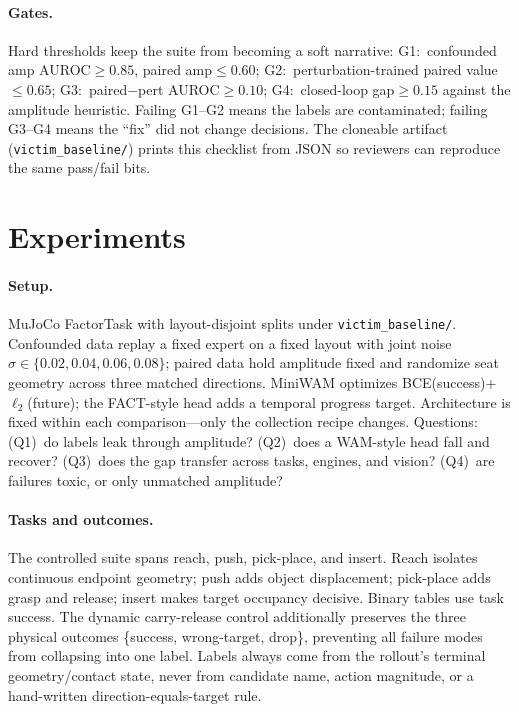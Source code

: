 \documentclass[conference]{IEEEtran}
\begin{document}
\paragraph{Gates.}
Hard thresholds keep the suite from becoming a soft narrative:
G1:~confounded amp AUROC$\ge 0.85$, paired amp$\le 0.60$;
G2:~perturbation-trained paired value$\le 0.65$;
G3:~paired$-$pert AUROC$\ge 0.10$;
G4:~closed-loop gap$\ge 0.15$ against the amplitude heuristic.
Failing G1--G2 means the labels are contaminated; failing G3--G4 means the
``fix'' did not change decisions. The cloneable artifact
(\texttt{victim\_baseline/}) prints this checklist from JSON so reviewers can
reproduce the same pass/fail bits.

\section{Experiments}
\label{sec:exp}

\paragraph{Setup.}
MuJoCo FactorTask with layout-disjoint splits under
\texttt{victim\_baseline/}. Confounded data replay a fixed expert on a fixed
layout with joint noise $\sigma\in\{0.02,0.04,0.06,0.08\}$; paired data hold
amplitude fixed and randomize seat geometry across three matched directions.
MiniWAM optimizes BCE(success)+$\ell_2$(future); the FACT-style head adds a
temporal progress target. Architecture is fixed within each comparison---only
the collection recipe changes. Questions: (Q1)~do labels leak through amplitude?
(Q2)~does a WAM-style head fall and recover? (Q3)~does the gap transfer across
tasks, engines, and vision? (Q4)~are failures toxic, or only unmatched
amplitude?

\paragraph{Tasks and outcomes.}
The controlled suite spans reach, push, pick-place, and insert. Reach isolates
continuous endpoint geometry; push adds object displacement; pick-place adds
grasp and release; insert makes target occupancy decisive. Binary tables use
task success. The dynamic carry-release control additionally preserves the
three physical outcomes \{success, wrong-target, drop\}, preventing all failure
modes from collapsing into one label. Labels always come from the rollout's
terminal geometry/contact state, never from candidate name, action magnitude,
or a hand-written direction-equals-target rule.
\end{document}

